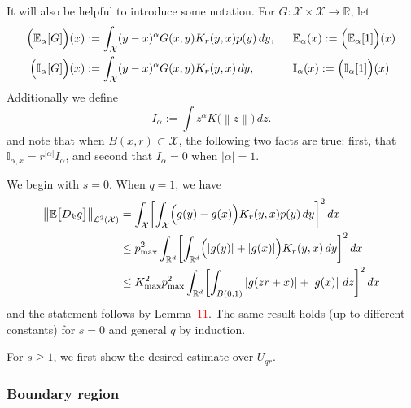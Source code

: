 \documentclass{article}
\newcommand{\Reals}{\mathbb{R}}
\newcommand{\abs}[1]{\left \lvert #1 \right \rvert}
\newcommand{\norm}[1]{\left \lVert #1 \right \rVert}
\newcommand{\1}{\mathbf{1}}
\newcommand{\Rd}{\Reals^d}
\newcommand{\Xset}{\mathcal{X}}
\newcommand{\Leb}{\mathcal{L}}
\newcommand{\Ebb}{\mathbb{E}}
\newcommand{\Ibb}{\mathbb{I}}
\theoremstyle{alden}
\theoremstyle{aldenthm}
\theoremstyle{definition}
\theoremstyle{remark}
\begin{document}
It will also be helpful to introduce some notation. For $G: \Xset \times \Xset \to \Reals$, let
\begin{align*}
\Bigl(\Ebb_{\alpha}[G]\Bigr)(x) & := \int_{\Xset} (y - x)^{\alpha} G(x,y) K_r(y,x) p(y) \,dy,~~ && \Ebb_{\alpha}(x) := \Bigl(\Ebb_{\alpha}[1]\Bigr)(x) \\
\Bigl(\Ibb_{\alpha}[G]\Bigr)(x) & := \int_{\Xset} (y - x)^{\alpha} G(x,y) K_r(y,x) \,dy,~~ && \Ibb_{\alpha}(x)  := \Bigl(\Ibb_{\alpha}[1]\Bigr)(x)
\end{align*}
Additionally we define
\begin{equation*}
I_{\alpha} := \int z^{\alpha} K\bigl(\norm{z}\bigr) \,dz.
\end{equation*}
and note that when $B(x,r) \subset \Xset$, the following two facts are true: first, that $\Ibb_{\alpha,x} = r^{\abs{\alpha}} I_{\alpha}$, and second that $I_{\alpha} = 0$ when $\abs{\alpha} = 1$.

We begin with $s = 0$. When $q = 1$, we have
\begin{align*}
\norm{\Ebb\bigl[D_kg\bigr]}_{\Leb^2(\Xset)} & = \int_{\Xset} \biggl[\int_{\Xset} \Bigl(g(y) - g(x)\Bigr)K_r(y,x) p(y) \,dy \biggr]^2 \,dx \\
& \leq p_{\max}^2 \int_{\Rd} \biggl[\int_{\Rd} \Bigl(\abs{g(y)} + \abs{g(x)}\Bigr)K_r(y,x) \,dy \biggr]^2 \,dx \\
& \leq K_{\max}^2 p_{\max}^2 \int_{\Rd} \biggl[\int_{B(0,1)} \abs{g(zr + x)} + \abs{g(x)} \,dz \biggr]^2 \,dx
\end{align*}
and the statement follows by Lemma~\textcolor{red}{11}. The same result holds (up to different constants) for $s = 0$ and general $q$ by induction.

For $s \geq 1$, we first show the desired estimate over $U_{qr}$.

\subsubsection{Boundary region}
\end{document}
